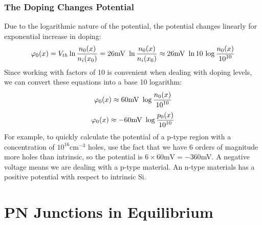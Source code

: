 \subsubsection{The Doping Changes Potential}
Due to the logarithmic nature of the potential, the potential changes linearly for exponential increase in doping:
    \begin{equation} 
        {\varphi _0}(x) = {V_{th}}\ln \frac{{{n_0}(x)}}{{{n_i}({x_0})}} = 26{\rm{mV}}\,\,\ln \frac{{{n_0}(x)}}{{{n_i}({x_0})}} \approx 26{\rm{mV}}\,\,\ln 10\,\log \frac{{{n_0}(x)}}{{{{10}^{10}}}} 
    \end{equation}
Since working with factors of 10 is convenient when dealing with doping levels, we can convert these equations into a base 10 logarithm:
    \begin{equation} 
        {\varphi _0}(x) \approx 60{\rm{mV}}\,\,\log \frac{{{n_0}(x)}}{{{{10}^{10}}}} 
    \end{equation}
    \begin{equation} 
        {\varphi _0}(x) \approx  - 60{\rm{mV}}\,\,\log \frac{{{p_0}(x)}}{{{{10}^{10}}}} 
    \end{equation}
For example, to quickly calculate the potential of a p-type region with a concentration of $10^{16} \mathrm{cm}^{-3}$ holes, use the fact that we have 6 orders of magnitude more holes than intrinsic, so the potential is $6 \times 60\mathrm{mV} = -360 $mV.  A negative voltage means we are dealing with a p-type material.  An n-type materials has a positive potential with respect to intrinsic Si.
\section{PN Junctions in Equilibrium}
